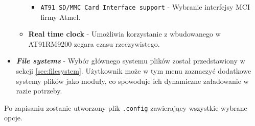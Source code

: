 \documentclass[a4paper,12pt]{book}
\begin{document}
\begin{itemize}
\begin{itemize}
\begin{itemize}
										\item \texttt{AT91 SD/MMC Card Interface support} - Wybranie interfejsy MCI firmy Atmel.
									\end{itemize}
								\item \textbf{Real time clock} - Umożliwia korzystanie z wbudowanego w AT91RM9200 zegara czasu rzeczywistego.
							\end{itemize}
						\item \textit{\textbf{File systems}} - Wybór głównego systemu plików został przedstawiony w sekcji \ref{sec:filesystem}. Użytkownik może w tym menu zaznaczyć dodatkowe systemy plików jako moduły, co spowoduje ich dynamiczne załadowanie w razie potrzeby.				
					\end{itemize}
					Po zapisaniu zostanie utworzony plik \texttt{.config} zawierający wszystkie wybrane opcje.
\end{document}
